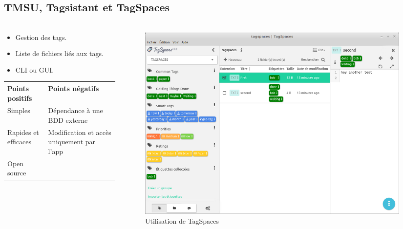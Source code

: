 \documentclass[10pt]{beamer}
\begin{document}
\subsection{TMSU, Tagsistant et TagSpaces}
\begin{frame}
    \frametitle{\subsecname}
    \begin{columns}[T]
        \begin{column}{.35\textwidth}
        \fontsize{7pt}{8}\selectfont
            \begin{center}
                \begin{itemize}
                    \item Gestion des tags.
                    \item Liste de fichiers liés aux tags.
                    \item CLI ou GUI.
                \end{itemize}
                \pause[3]
                \bigbreak
                \begin{tabularx}{4.5cm}{|p{1.8cm}|X|} \hline
                    \textbf{Points positifs} & \textbf{Points négatifs} \\ \hline
                    Simples & Dépendance à une BDD externe \\ \hline
                    Rapides et efficaces & Modification et accès uniquement par l'app \\ \hline
                    Open source & \\ \hline
                \end{tabularx}
            \end{center}
        \end{column}
        \pause[2]
        \begin{column}{.65\textwidth}
            \begin{flushright}
                \begin{figure}
                    \includegraphics[width=0.98\textwidth]{images/tagspaces.png}
                    \caption{Utilisation de TagSpaces}
                \end{figure}
            \end{flushright}
        \end{column}
    \end{columns}
\end{frame}
\end{document}
